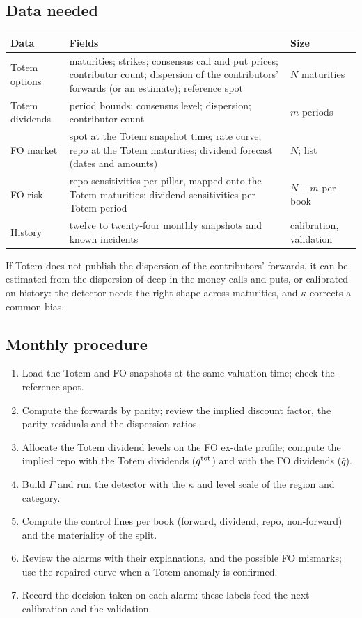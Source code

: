 \subsection{Data needed}
\begin{center}\small
\begin{tabular}{@{}>{\raggedright\arraybackslash}p{2.6cm}>{\raggedright\arraybackslash}p{9.3cm}
>{\raggedright\arraybackslash}p{2.6cm}@{}}
\toprule
Data & Fields & Size\\
\midrule
Totem options & maturities; strikes; consensus call and put prices; contributor count; dispersion of the contributors'
forwards (or an estimate); reference spot & $N$ maturities\\
Totem dividends & period bounds; consensus level; dispersion; contributor count & $m$ periods\\
FO market & spot at the Totem snapshot time; rate curve; repo at the Totem maturities; dividend forecast (dates and
amounts) & $N$; list\\
FO risk & repo sensitivities per pillar, mapped onto the Totem maturities; dividend sensitivities per Totem period &
$N+m$ per book\\
History & twelve to twenty-four monthly snapshots and known incidents & calibration, validation\\
\bottomrule
\end{tabular}
\end{center}
If Totem does not publish the dispersion of the contributors' forwards, it can be estimated from the dispersion of deep
in-the-money calls and puts, or calibrated on history: the detector needs the right shape across maturities, and
$\kappa$ corrects a common bias.

\subsection{Monthly procedure}
\begin{enumerate}
\item Load the Totem and FO snapshots at the same valuation time; check the reference spot.
\item Compute the forwards by parity; review the implied discount factor, the parity residuals and the dispersion
ratios.
\item Allocate the Totem dividend levels on the FO ex-date profile; compute the implied repo with the Totem dividends
($q^{\mathrm{tot}}$) and with the FO dividends ($\hat q$).
\item Build $\Gamma$ and run the detector with the $\kappa$ and level scale of the region and category.
\item Compute the control lines per book (forward, dividend, repo, non-forward) and the materiality of the split.
\item Review the alarms with their explanations, and the possible FO mismarks; use the repaired curve when a Totem
anomaly is confirmed.
\item Record the decision taken on each alarm: these labels feed the next calibration and the validation.
\end{enumerate}

